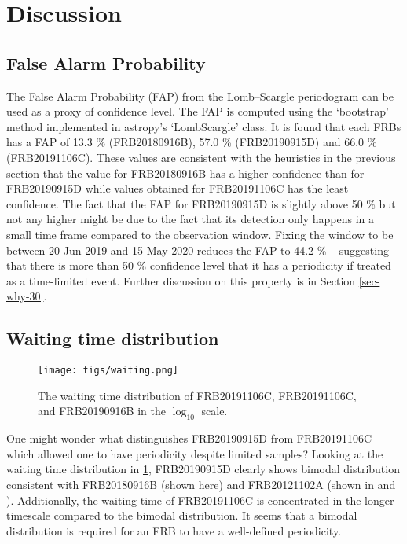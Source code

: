 \documentclass[reprint,amsmath,amssymb,showkeys,prd]{revtex4-2}
\begin{document}
\section{Discussion}

\subsection{False Alarm Probability}

The False Alarm Probability (FAP) from the Lomb--Scargle periodogram can be used as a proxy of confidence level.
The FAP is computed using the `bootstrap' method implemented in astropy's `LombScargle' class.
It is found that each FRBs has a FAP of 13.3 \% (FRB20180916B), 57.0 \% (FRB20190915D) and 66.0 \% (FRB20191106C).
These values are consistent with the heuristics in the previous section that the value for FRB20180916B has a higher confidence than for FRB20190915D while values obtained for FRB20191106C has the least confidence.
The fact that the FAP for FRB20190915D is slightly above 50 \% but not any higher might be due to the fact that its detection only happens in a small time frame compared to the observation window.
Fixing the window to be between 20 Jun 2019 and 15 May 2020 reduces the FAP to 44.2 \% -- suggesting that there is more than 50 \% confidence level that it has a periodicity if treated as a time-limited event. 
Further discussion on this property is in Section \ref{sec-why-30}.

\subsection{Waiting time distribution}

\begin{figure}[h]
    \label{fig-waitingtime}
    \caption{The waiting time distribution of FRB20191106C, FRB20191106C, and FRB20190916B in the $\log_{10}$ scale.}
    \centering
    \texttt{[image: figs/waiting.png]}
\end{figure}

One might wonder what distinguishes FRB20190915D from FRB20191106C which allowed one to have periodicity despite limited samples?
Looking at the waiting time distribution in \ref{fig-waitingtime}, FRB20190915D clearly shows bimodal distribution consistent with FRB20180916B (shown here) 
and FRB20121102A (shown in \citet{hewitt_AreciboObservationsBurst_2022} and \citet{jahns_FRB20121102ANovember_2022}).
Additionally, the waiting time of FRB20191106C is concentrated in the longer timescale compared to the bimodal distribution.
It seems that a bimodal distribution is required for an FRB to have a well-defined periodicity.
\end{document}
